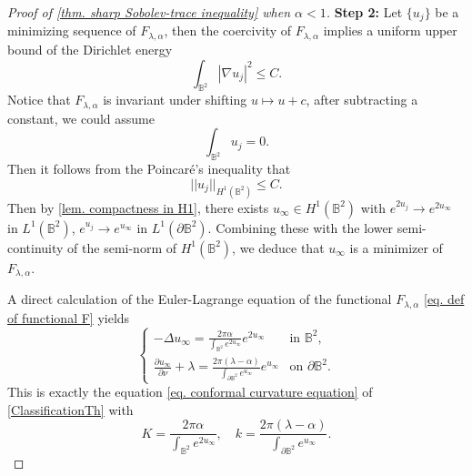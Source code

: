 \documentclass[11pt,a4paper,twoside]{amsart}
\newtheorem{sketch proof}{Sketch of the proof}[section]
\begin{document}
\begin{proof}[Proof of \cref{thm. sharp Sobolev-trace inequality} when $\alpha<1$]
        {\bf Step 2:} Let $\{u_j\}$ be a minimizing sequence of $F_{\lambda,\alpha}$, then the coercivity of $F_{\lambda,\alpha}$ implies a uniform upper bound of the Dirichlet energy
        \[
        \int_{\mathbb{B}^2}|\nabla u_j|^2\leq C.
        \]
        Notice that $F_{\lambda,\alpha}$ is invariant under shifting $u\mapsto u+c$, after subtracting a constant, we could assume
        \[
        \int_{\mathbb{B}^2}u_j=0.
        \]
        Then it follows from the Poincar\'e's inequality that
        \[
        ||u_j||_{H^1(\mathbb{B}^2)}\leq C.
        \]
        Then by \cref{lem. compactness in H1}, there exists $u_\infty\in H^1(\mathbb{B}^2)$ with $e^{2u_j}\to e^{2u_\infty}$ in $L^1(\mathbb{B}^2)$, $e^{u_j}\to e^{u_\infty}$ in $L^1(\partial\mathbb{B}^2)$. Combining these with the lower semi-continuity of the semi-norm of $H^1(\mathbb{B}^2)$, we deduce that $u_\infty$ is a minimizer of $F_{\lambda,\alpha}$. 
        
        A direct calculation of the Euler-Lagrange equation of the functional $F_{\lambda,\alpha}$ \cref{eq. def of functional F} yields
        \begin{equation}\label{eq. equation of minimizer}
            \begin{cases}
               \displaystyle{ -\Delta u_\infty
                =\frac{2\pi\alpha}{\int_{\mathbb{B}^2}e^{2u_\infty}}e^{2u_\infty}} &\text{in }\mathbb{B}^2,\\[5mm]
                \displaystyle{\frac{\partial u_\infty}{\partial\nu}
                +\lambda
                =\frac{2\pi(\lambda-\alpha)}{\int_{\partial \mathbb{B}^2}e^{u_\infty}}e^{u_\infty}}
                &\text{on }\partial \mathbb{B}^2.
            \end{cases}
        \end{equation}
        This is exactly the equation \cref{eq. conformal curvature equation} of \cref{ClassificationTh} with
        \begin{equation*}\label{eq. determine K and k}
            K=\frac{2\pi\alpha}{\int_{\mathbb{B}^2}e^{2u_\infty}},\quad k=\frac{2\pi(\lambda-\alpha)}{\int_{\partial \mathbb{B}^2}e^{u_\infty}}.    
        \end{equation*}
        

\end{proof}
\end{document}

